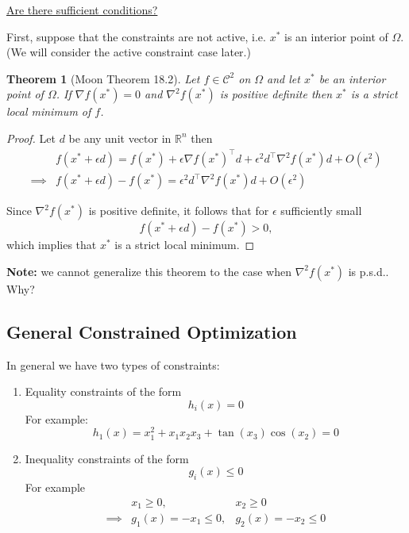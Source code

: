 \documentclass{article}
\newtheorem{theorem}{Theorem}[section]
\begin{document}
	\underline{Are there sufficient conditions?}
	
	
	First, suppose that the constraints are not active, i.e. $x^{\ast}$ is an interior point of $\Omega$.  (We will consider the active constraint case later.)
	
	
	\begin{theorem}[Moon Theorem 18.2]
		Let $f \in \mathcal{C}^2$ on $\Omega$ and let $x^{\ast}$ be an interior point of $\Omega$.  If $\nabla f(x^{\ast}) = 0$ and $\nabla^2f(x^{\ast})$ is positive definite then $x^{\ast}$ is a strict local minimum of $f$.
	\end{theorem}
	\begin{proof}
		Let $d$ be any unit vector in $\mathbb{R}^n$ then 
		\begin{align*}
			& 	f(x^{\ast} + \epsilon d) = f(x^{\ast}) + \epsilon\nabla f(x^{\ast})^\top d + \epsilon^2d^\top \nabla^2f(x^{\ast})d + O(\epsilon^2) \\
			\implies & 
			f(x^{\ast} + \epsilon d)  - f(x^{\ast}) = \epsilon^2d^\top \nabla^2f(x^{\ast})d + O(\epsilon^2)
		\end{align*}
	
		Since $\nabla^2f(x^{\ast})$ is positive definite, it follows that for $\epsilon$ sufficiently small
		\[ 
			f(x^{\ast}+\epsilon d) - f(x^{\ast}) > 0,
		\]
		which implies that $x^{\ast}$ is a strict local minimum. 	
	\end{proof}
	
	
	{\bf Note:} we cannot generalize this theorem to the case when $\nabla^2f(x^{\ast})$ is p.s.d..  Why?

\subsection{General Constrained Optimization}

	In general we have two types of constraints:
	\begin{enumerate}
		\item 	
			Equality constraints of the form
			\[ 
				h_i(x) = 0 
			\]
			For example:
			\[
				h_1(x) = x_1^2 + x_1x_2x_3 + \tan(x_3)\cos(x_2) = 0
			\]
			
		\item 
			Inequality constraints of the form
			\[ 
				g_i(x) \leq 0 
			\]
			For example
			\begin{align*}
				& x_1 \geq 0, & x_2 \geq 0 \\
				\implies & g_1(x) = -x_1 \leq 0, & g_2(x) = -x_2 \leq 0 
			\end{align*}
			\end{enumerate}
\end{document}
